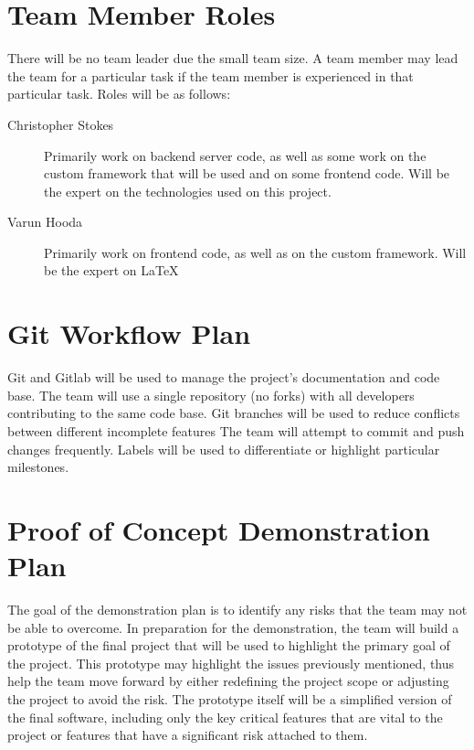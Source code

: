 \documentclass{article}
\begin{document}
\section{Team Member Roles}
There will be no team leader due the small team size. A team member may lead
the team for a particular task if the team member is experienced in that
particular task.
Roles will be as follows:
\begin{description}
  \item[Christopher Stokes] Primarily work on backend server code, as well as
    some work on the custom framework that will be used and on some frontend
    code. Will be the expert on the technologies used on this project.
  \item[Varun Hooda] Primarily work on frontend code, as well as on the custom
    framework. Will be the expert on \LaTeX
\end{description}

\section{Git Workflow Plan}
Git and Gitlab will be used to manage the project's documentation and code
base. The team will use a single repository (no forks) with all developers
contributing to the same code base. Git branches will be used to reduce
conflicts between different incomplete features The team will attempt to commit
and push changes frequently. Labels will be used to differentiate or highlight
particular milestones.

\section{Proof of Concept Demonstration Plan}
The goal of the demonstration plan is to identify any risks that the team may
not be able to overcome. In preparation for the demonstration, the team will
build a prototype of the final project that will be used to highlight the
primary goal of the project. This prototype may highlight the issues previously
mentioned, thus help the team move forward by either redefining the project
scope or adjusting the project to avoid the risk. The prototype itself will be
a simplified version of the final software, including only the key critical
features that are vital to the project or features that have a significant risk
attached to them.
\end{document}
